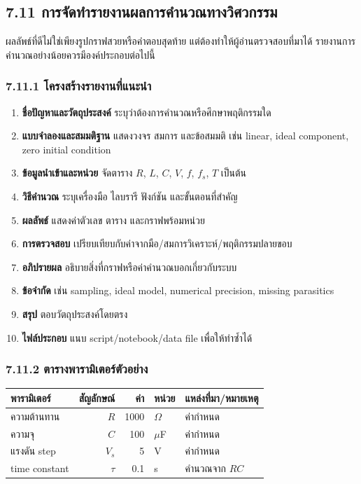 \subsection{7.11 การจัดทำรายงานผลการคำนวณทางวิศวกรรม}

ผลลัพธ์ที่ดีไม่ใช่เพียงรูปกราฟสวยหรือคำตอบสุดท้าย แต่ต้องทำให้ผู้อ่านตรวจสอบที่มาได้ รายงานการคำนวณอย่างน้อยควรมีองค์ประกอบต่อไปนี้

\subsubsection{7.11.1 โครงสร้างรายงานที่แนะนำ}

\begin{enumerate}
    \item \textbf{ชื่อปัญหาและวัตถุประสงค์}
    ระบุว่าต้องการคำนวณหรือศึกษาพฤติกรรมใด
    \item \textbf{แบบจำลองและสมมติฐาน}
    แสดงวงจร สมการ และข้อสมมติ เช่น linear, ideal component, zero initial condition
    \item \textbf{ข้อมูลนำเข้าและหน่วย}
    จัดตาราง $R$, $L$, $C$, $V$, $f$, $f_s$, $T$ เป็นต้น
    \item \textbf{วิธีคำนวณ}
    ระบุเครื่องมือ ไลบรารี ฟังก์ชัน และขั้นตอนที่สำคัญ
    \item \textbf{ผลลัพธ์}
    แสดงค่าตัวเลข ตาราง และกราฟพร้อมหน่วย
    \item \textbf{การตรวจสอบ}
    เปรียบเทียบกับค่าจากมือ/สมการวิเคราะห์/พฤติกรรมปลายขอบ
    \item \textbf{อภิปรายผล}
    อธิบายสิ่งที่กราฟหรือค่าคำนวณบอกเกี่ยวกับระบบ
    \item \textbf{ข้อจำกัด}
    เช่น sampling, ideal model, numerical precision, missing parasitics
    \item \textbf{สรุป}
    ตอบวัตถุประสงค์โดยตรง
    \item \textbf{ไฟล์ประกอบ}
    แนบ script/notebook/data file เพื่อให้ทำซ้ำได้
\end{enumerate}

\subsubsection{7.11.2 ตารางพารามิเตอร์ตัวอย่าง}

\begin{table}[htbp]
    \centering
    \begin{tabular}{l r r l l}
        \hline
        \textbf{พารามิเตอร์} & \textbf{สัญลักษณ์} & \textbf{ค่า} & \textbf{หน่วย} & \textbf{แหล่งที่มา/หมายเหตุ} \\
        \hline
        ความต้านทาน & $R$ & 1000 & $\Omega$ & ค่ากำหนด \\
        ความจุ & $C$ & 100 & $\mu$F & ค่ากำหนด \\
        แรงดัน step & $V_s$ & 5 & V & ค่ากำหนด \\
        time constant & $\tau$ & 0.1 & s & คำนวณจาก $RC$ \\
        \hline
    \end{tabular}
\end{table}

